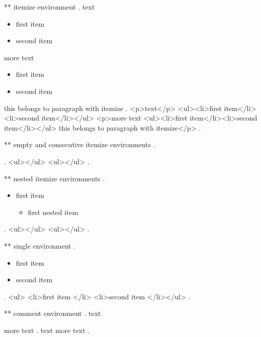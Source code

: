 ** itemize environment
.
text

\begin{itemize}
    \item first item
    \item second item
\end{itemize}

more text
\begin{itemize}
    \item first item
    \item second item
\end{itemize}
this belongs to paragraph with itemize
.
<p>text</p>
<ul><li>first item</li><li>second item</li></ul>
<p>more text
<ul><li>first item</li><li>second item</li></ul>
this belongs to paragraph with itemize</p>
.


** empty and consecutive itemize environments
.
\begin{itemize}
\end{itemize}
\begin{itemize}
\end{itemize}
.
<ul></ul>
<ul></ul>
.


** nested itemize environments
.
\begin{itemize}
    \item first item
    \begin{itemize}
        \item first nested item
    \end{itemize}
\end{itemize}
.
<ul></ul>
<ul></ul>
.


** single environment
.
\begin{itemize}
    \item first item
    \item second item
\end{itemize}
.
<ul>
<li>ﬁrst item </li>
<li>second item </li></ul>
.


** comment environment
.
text
\begin{comment}
    This is a comment.
\end{comment}
more text
.
text
more text
.